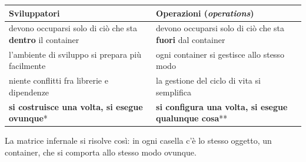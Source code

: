 \begin{center}
\renewcommand{\arraystretch}{1.25}
\begin{tabular}{P{7.4cm}P{7.4cm}}
\toprule
\textbf{Sviluppatori} & \textbf{Operazioni (\textit{operations})} \\
\midrule
devono occuparsi solo di ciò che sta \textbf{dentro} il container &
devono occuparsi solo di ciò che sta \textbf{fuori} dal container \\
l'ambiente di sviluppo si prepara più facilmente &
ogni container si gestisce allo stesso modo \\
niente conflitti fra librerie e dipendenze &
la gestione del ciclo di vita si semplifica \\
\textbf{si costruisce una volta, si esegue ovunque}* &
\textbf{si configura una volta, si esegue qualunque cosa}** \\
\bottomrule
\end{tabular}
\end{center}


\medskip
{}
La matrice infernale si risolve così: in ogni casella c'è lo stesso oggetto, un container, che si comporta allo stesso
modo ovunque.

